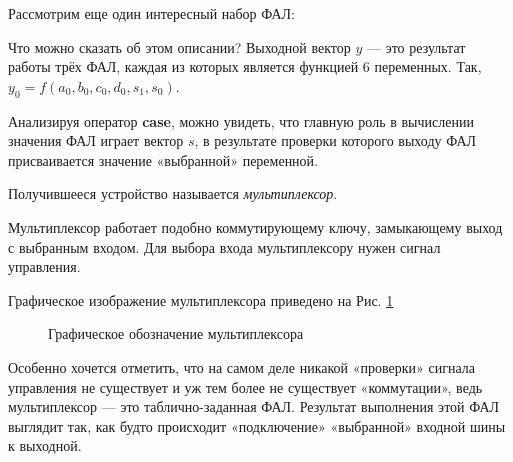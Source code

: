 \documentclass[a5paper, DIV=14, headings=openany, twoside=true,fontsize=10pt, titlepage]{scrreprt}
\newcommand{\quotes}[1]{«#1»}
\newcommand{\eng}[1]{\foreignlanguage{english}{#1}}
\newcommand{\kword}[1]{\eng{\textbf{#1}}}
\begin{document}
\par{Рассмотрим еще один интересный набор ФАЛ:}

  

\par{Что можно сказать об этом описании? Выходной вектор $y$ — это результат работы трёх ФАЛ, каждая из которых является функцией 6 переменных. Так, $y_0 = f(a_0, b_0, c_0, d_0, s_1, s_0)$.}

\par{Анализируя оператор \kword{case}, можно увидеть, что главную роль в вычислении значения ФАЛ играет вектор $s$, в результате проверки которого выходу ФАЛ присваивается значение \quotes{выбранной} переменной.}

\par{Получившееся устройство называется \emph{мультиплексор}}.

\par{Мультиплексор работает подобно коммутирующему ключу, замыкающему выход с выбранным входом. Для выбора входа мультиплексору нужен сигнал управления. }

\par{Графическое изображение мультиплексора приведено на Рис. \ref{fig:mux}}

\begin{figure}[H]
\centering
\def\svgwidth{\columnwidth}

\caption{Графическое обозначение мультиплексора}
\label{fig:mux}
\end{figure}

\par{Особенно хочется отметить, что на самом деле никакой \quotes{проверки} сигнала управления не существует и уж тем более не существует \quotes{коммутации}, ведь мультиплексор — это таблично-заданная ФАЛ. Результат выполнения этой ФАЛ выглядит так, как будто происходит \quotes{подключение} \quotes{выбранной} входной шины к выходной.}
\end{document}
